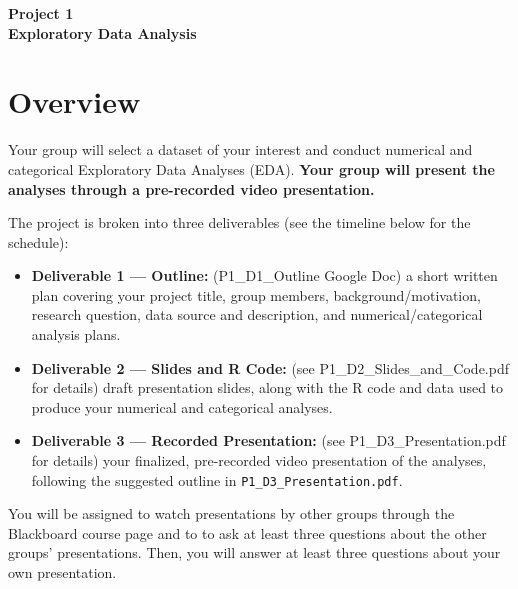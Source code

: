 \documentclass[12pt]{article}
\begin{document}
\begin{center}
\textbf{\Large Project 1 \\ Exploratory Data Analysis } 
\end{center}


\section*{Overview}
Your group will select a dataset of your interest and conduct numerical and categorical Exploratory Data Analyses (EDA).
\textbf{Your group will present the analyses through a pre-recorded video presentation.}

\vspace{6pt}
The project is broken into three deliverables (see the timeline below for the schedule):
\begin{itemize}
    \item \textbf{Deliverable 1 --- Outline:} (P1\_D1\_Outline Google Doc) a short written plan covering your project title, group members, background/motivation, research question, data source and description, and numerical/categorical analysis plans.
    \item \textbf{Deliverable 2 --- Slides and R Code:} (see P1\_D2\_Slides\_and\_Code.pdf for details) draft presentation slides, along with the R code and data used to produce your numerical and categorical analyses.
    \item \textbf{Deliverable 3 --- Recorded Presentation:} (see P1\_D3\_Presentation.pdf for details) your finalized, pre-recorded video presentation of the analyses, following the suggested outline in \texttt{P1\_D3\_Presentation.pdf}.
\end{itemize}
You will be assigned to watch presentations by other groups through the Blackboard course page and to to ask at least three questions about the other groups' presentations. 
Then, you will answer at least three questions about your own presentation. 
\end{document}
